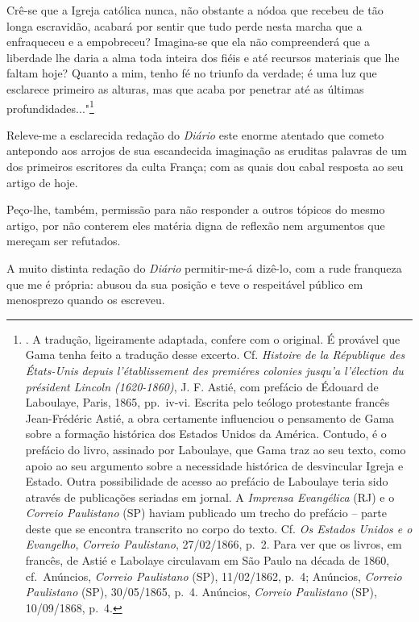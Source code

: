 Crê-se que a Igreja católica nunca, não obstante a nódoa que recebeu de
tão longa escravidão, acabará por sentir que tudo perde nesta marcha que
a enfraqueceu e a empobreceu? Imagina-se que ela não compreenderá que a
liberdade lhe daria a alma toda inteira dos fiéis e até recursos
materiais que lhe faltam hoje? Quanto a mim, tenho fé no triunfo da
verdade; é uma luz que esclarece primeiro as alturas, mas que acaba por
penetrar até as últimas profundidades..."\footnote{. A tradução,
  ligeiramente adaptada, confere com o original. É provável que Gama
  tenha feito a tradução desse excerto. Cf. \emph{Histoire de la
  République des États-Unis} \emph{depuis l'établissement des premiéres
  colonies jusqu'a l'élection du président Lincoln (1620-1860)}, J. F.
  Astié, com prefácio de Édouard de Laboulaye, Paris, 1865, pp.~iv-vi.
  Escrita pelo teólogo protestante francês Jean-Frédéric Astié, a obra
  certamente influenciou o pensamento de Gama sobre a formação histórica
  dos Estados Unidos da América. Contudo, é o prefácio do livro,
  assinado por Laboulaye, que Gama traz ao seu texto, como apoio ao seu
  argumento sobre a necessidade histórica de desvincular Igreja e
  Estado. Outra possibilidade de acesso ao prefácio de Laboulaye teria
  sido através de publicações seriadas em jornal. A \emph{Imprensa
  Evangélica} (RJ) e o \emph{Correio Paulistano} (SP) haviam publicado
  um trecho do prefácio -- parte deste que se encontra transcrito no
  corpo do texto. Cf. \emph{Os Estados Unidos e o Evangelho},
  \emph{Correio Paulistano}, 27/02/1866, p.~2. Para ver que os livros,
  em francês, de Astié e Labolaye circulavam em São Paulo na década de
  1860, cf.~Anúncios, \emph{Correio Paulistano} (SP), 11/02/1862, p.~4;
  Anúncios, \emph{Correio Paulistano} (SP), 30/05/1865, p.~4. Anúncios,
  \emph{Correio Paulistano} (SP), 10/09/1868, p.~4.}

Releve-me a esclarecida redação do \emph{Diário} este enorme atentado
que cometo antepondo aos arrojos de sua escandecida imaginação as
eruditas palavras de um dos primeiros escritores da culta França; com as
quais dou cabal resposta ao seu artigo de hoje.

Peço-lhe, também, permissão para não responder a outros tópicos do mesmo
artigo, por não conterem eles matéria digna de reflexão nem argumentos
que mereçam ser refutados.

A muito distinta redação do \emph{Diário} permitir-me-á dizê-lo, com a
rude franqueza que me é própria: abusou da sua posição e teve o
respeitável público em menosprezo quando os escreveu.

